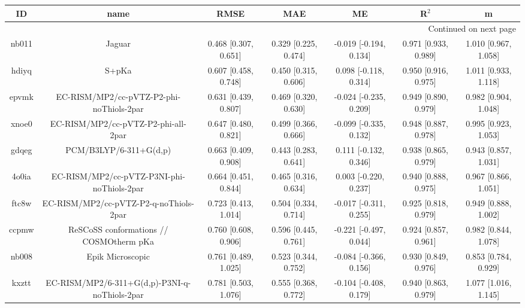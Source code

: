 \documentclass{article}
\begin{document}
\begin{center}
\begin{longtable}{|ccccccc|}
\toprule
    ID &                                               name &                  RMSE &                   MAE &                      ME &                 R$^2$ &                      m \\
\midrule
\endhead
\midrule
\multicolumn{7}{r}{{Continued on next page}} \\
\midrule
\endfoot

\bottomrule
\endlastfoot
 nb011 &                                             Jaguar &  0.468 [0.307, 0.651] &  0.329 [0.225, 0.474] &  -0.019 [-0.194, 0.134] &  0.971 [0.933, 0.989] &   1.010 [0.967, 1.058] \\
 hdiyq &                                              S+pKa &  0.607 [0.458, 0.748] &  0.450 [0.315, 0.606] &   0.098 [-0.118, 0.314] &  0.950 [0.916, 0.975] &   1.011 [0.933, 1.118] \\
 epvmk &           EC-RISM/MP2/cc-pVTZ-P2-phi-noThiols-2par &  0.631 [0.439, 0.807] &  0.469 [0.320, 0.630] &  -0.024 [-0.235, 0.209] &  0.949 [0.890, 0.979] &   0.982 [0.904, 1.048] \\
 xnoe0 &                EC-RISM/MP2/cc-pVTZ-P2-phi-all-2par &  0.647 [0.480, 0.821] &  0.499 [0.366, 0.666] &  -0.099 [-0.335, 0.132] &  0.948 [0.887, 0.978] &   0.995 [0.923, 1.053] \\
 gdqeg &                             PCM/B3LYP/6-311+G(d,p) &  0.663 [0.409, 0.908] &  0.443 [0.283, 0.641] &   0.111 [-0.132, 0.346] &  0.938 [0.865, 0.979] &   0.943 [0.857, 1.031] \\
 4o0ia &         EC-RISM/MP2/cc-pVTZ-P3NI-phi-noThiols-2par &  0.664 [0.451, 0.844] &  0.465 [0.316, 0.634] &   0.003 [-0.220, 0.237] &  0.940 [0.888, 0.975] &   0.967 [0.866, 1.051] \\
 ftc8w &             EC-RISM/MP2/cc-pVTZ-P2-q-noThiols-2par &  0.723 [0.413, 1.014] &  0.504 [0.334, 0.714] &  -0.017 [-0.311, 0.255] &  0.925 [0.818, 0.979] &   0.949 [0.888, 1.002] \\
 ccpmw &            ReSCoSS conformations // COSMOtherm pKa &  0.760 [0.608, 0.906] &  0.596 [0.445, 0.761] &  -0.221 [-0.497, 0.044] &  0.924 [0.857, 0.961] &   0.982 [0.844, 1.078] \\
 nb008 &                                   Epik Microscopic &  0.761 [0.489, 1.025] &  0.523 [0.344, 0.752] &  -0.084 [-0.366, 0.156] &  0.930 [0.849, 0.976] &   0.853 [0.784, 0.929] \\
 kxztt &      EC-RISM/MP2/6-311+G(d,p)-P3NI-q-noThiols-2par &  0.781 [0.503, 1.076] &  0.555 [0.368, 0.772] &  -0.104 [-0.408, 0.179] &  0.940 [0.863, 0.979] &   1.077 [1.016, 1.145] \\

\end{longtable}
\end{center}
\end{document}
